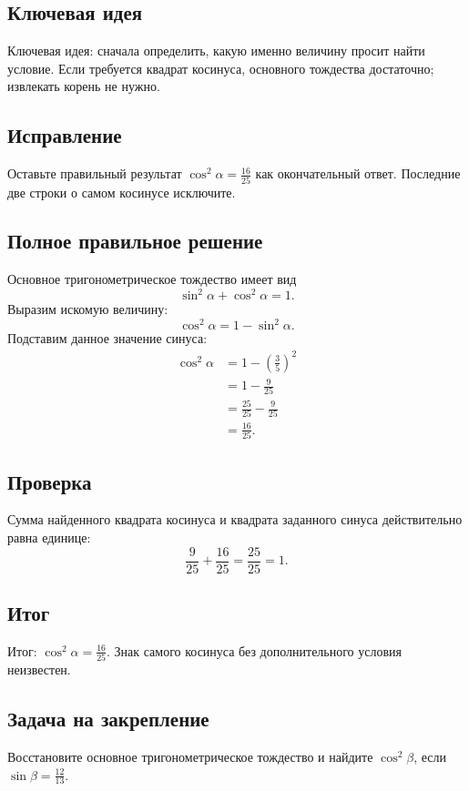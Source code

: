 \documentclass[12pt,a4paper]{article}
\begin{document}
\subsection*{Ключевая идея}
\textcolor{blue!60!black}{Ключевая идея:} сначала определить, какую именно величину просит найти условие. Если требуется квадрат косинуса, основного тождества достаточно; извлекать корень не нужно.

\subsection*{Исправление}
Оставьте правильный результат $\cos^2\alpha=\frac{16}{25}$ как окончательный ответ. Последние две строки о самом косинусе исключите.

\subsection*{Полное правильное решение}
Основное тригонометрическое тождество имеет вид
\[
\sin^2\alpha+\cos^2\alpha=1.
\]
Выразим искомую величину:
\[
\cos^2\alpha=1-\sin^2\alpha.
\]
Подставим данное значение синуса:
\begin{align*}
\cos^2\alpha
&=1-\left(\frac35\right)^2\\
&=1-\frac9{25}\\
&=\frac{25}{25}-\frac9{25}\\
&=\frac{16}{25}.
\end{align*}

\subsection*{Проверка}
Сумма найденного квадрата косинуса и квадрата заданного синуса действительно равна единице:
\[
\frac9{25}+\frac{16}{25}=\frac{25}{25}=1.
\]

\subsection*{Итог}
\textcolor{teal!60!black}{Итог:} $\boxed{\cos^2\alpha=\frac{16}{25}}$. Знак самого косинуса без дополнительного условия неизвестен.

\subsection*{Задача на закрепление}
Восстановите основное тригонометрическое тождество и найдите $\cos^2\beta$, если $\sin\beta=\frac{12}{13}$.
\end{document}
